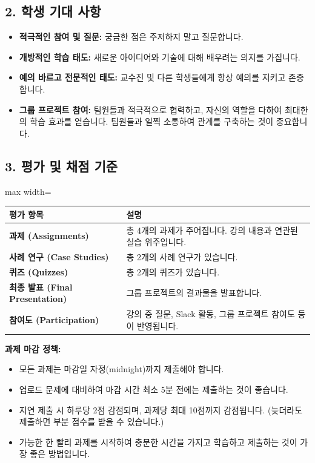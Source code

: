 \documentclass[11pt,a4paper]{article}
\theoremstyle{definition}
\begin{document}
\begin{itemize}
\subsection*{2. 학생 기대 사항}

\begin{itemize}
    \item \textbf{적극적인 참여 및 질문:} 궁금한 점은 주저하지 말고 질문합니다.
    \item \textbf{개방적인 학습 태도:} 새로운 아이디어와 기술에 대해 배우려는 의지를 가집니다.
    \item \textbf{예의 바르고 전문적인 태도:} 교수진 및 다른 학생들에게 항상 예의를 지키고 존중합니다.
    \item \textbf{그룹 프로젝트 참여:} 팀원들과 적극적으로 협력하고, 자신의 역할을 다하여 최대한의 학습 효과를 얻습니다. 팀원들과 일찍 소통하여 관계를 구축하는 것이 중요합니다.
\end{itemize}

\subsection*{3. 평가 및 채점 기준}

\begin{adjustbox}{max width=\textwidth}
\begin{tabular}{ll}
\toprule
\textbf{평가 항목} & \textbf{설명} \\
\midrule
\textbf{과제 (Assignments)} & 총 4개의 과제가 주어집니다. 강의 내용과 연관된 실습 위주입니다. \\
\textbf{사례 연구 (Case Studies)} & 총 2개의 사례 연구가 있습니다. \\
\textbf{퀴즈 (Quizzes)} & 총 2개의 퀴즈가 있습니다. \\
\textbf{최종 발표 (Final Presentation)} & 그룹 프로젝트의 결과물을 발표합니다. \\
\textbf{참여도 (Participation)} & 강의 중 질문, Slack 활동, 그룹 프로젝트 참여도 등이 반영됩니다. \\
\bottomrule
\end{tabular}
\end{adjustbox}

\begin{warningbox}
\textbf{과제 마감 정책:}
\begin{itemize}
    \item 모든 과제는 마감일 자정(midnight)까지 제출해야 합니다.
    \item 업로드 문제에 대비하여 마감 시간 최소 5분 전에는 제출하는 것이 좋습니다.
    \item 지연 제출 시 하루당 2점 감점되며, 과제당 최대 10점까지 감점됩니다. (늦더라도 제출하면 부분 점수를 받을 수 있습니다.)
    \item 가능한 한 빨리 과제를 시작하여 충분한 시간을 가지고 학습하고 제출하는 것이 가장 좋은 방법입니다.
\end{itemize}
\end{warningbox}


\end{itemize}
\end{document}
